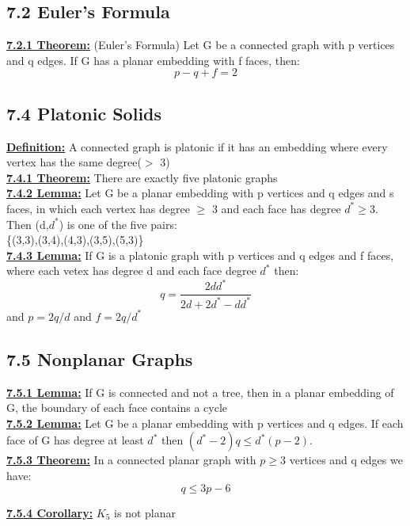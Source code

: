 \documentclass[12pt]{article}
\newcommand{\myt}[1]{\textbf{\underline{#1}}}
\begin{document}
	\subsection*{7.2 Euler's Formula}
	\myt{7.2.1 Theorem:} (Euler's Formula) Let G be a connected graph with p vertices and q edges. If G has a planar embedding with f faces, then:\\
	$$p - q + f = 2$$
	
	\subsection*{7.4 Platonic Solids}
	\myt{Definition:} A connected graph is platonic if it has an embedding where every vertex has the same degree($>$ 3)\\
	
	\myt{7.4.1 Theorem:} There are exactly five platonic graphs\\
	
	\myt{7.4.2 Lemma:} Let G be a planar embedding with p vertices and q edges and s faces, in which each vertex has degree $\geq$ 3 and each face has degree $d^* \geq 3$. Then (d,$d^*$) is one of the five pairs:\\
	\{(3,3),(3,4),(4,3),(3,5),(5,3)\}\\
	
	\myt{7.4.3 Lemma:} If G is a platonic graph with p vertices and q edges and f faces, where each vetex has degree d and each face degree $d^*$ then:\\
	$$q = \frac{2dd^*}{2d + 2d^* - dd^*}$$
	and $p = 2q/d$ and $f = 2q/d^*$\\
	
	\subsection*{7.5 Nonplanar Graphs}
	\myt{7.5.1 Lemma:} If G is connected and not a tree, then in a planar embedding of G, the boundary of each face contains a cycle\\
	
	\myt{7.5.2 Lemma:} Let G be a planar embedding with p vertices and q edges. If each face of G has degree at least $d^*$ then $(d^* - 2)q \leq d^*(p-2)$.\\
	
	\myt{7.5.3 Theorem:} In a connected planar graph with $p \geq 3$ vertices and q edges we have:\\
	$$q \leq 3p - 6$$
	
	\myt{7.5.4 Corollary:} $K_5$ is not planar\\
	
\end{document}
